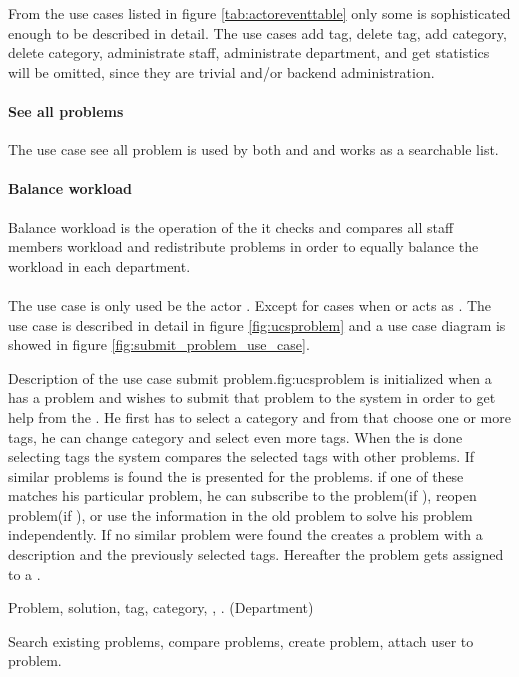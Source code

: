From the use cases listed in figure \ref{tab:actoreventtable} only some is sophisticated enough to be described in detail.  
The use cases add tag, delete tag, add category, delete category, administrate staff, administrate department, and get statistics will be omitted, since they are trivial and/or backend administration. 

\paragraph{See all problems} The use case see all problem is used by both \aclient{} and \astaff{} and works as a searchable list. 

\paragraph{Balance workload} Balance workload is the operation of the \wmon{} it checks and compares all staff members workload and redistribute problems in order to equally balance the workload in each department. 

\paragraph{\ucsproblem[c]} The use case \ucsproblem[] is only used be the actor \aclient. Except for cases when \astaff{} or \sadmin{}  acts as \aclient{}. The use case is described in detail in figure \ref{fig:ucsproblem} and a use case diagram is showed in figure \ref{fig:submit_problem_use_case}. 


\begin{sadlist}[h]{\ucsproblem[c]}{Description of the use case submit problem.}{fig:ucsproblem}
 \ucsproblem[c] is initialized when a \aclient{} has a problem and wishes to submit that problem to the system in order to get help from the \astaff{}. 
He first has to select a category and from that choose one or more tags, he can change category and select even more tags. 
When the \aclient{} is done selecting tags the system compares the selected tags with other problems. 
If similar problems is found the \aclient{} is presented for the problems.
if one of these matches his particular problem, he can subscribe to the problem(if \open), reopen problem(if \closed{}), or use the information in the old problem to solve his problem independently. 
If no similar problem were found the \aclient{} creates a problem with a description and the previously selected tags. 
Hereafter the problem gets assigned to a \astaff{}. 

 Problem, solution, tag, category, \client, \staff. (Department)

 Search existing problems, compare problems, create problem, attach user to problem.


\end{sadlist}

